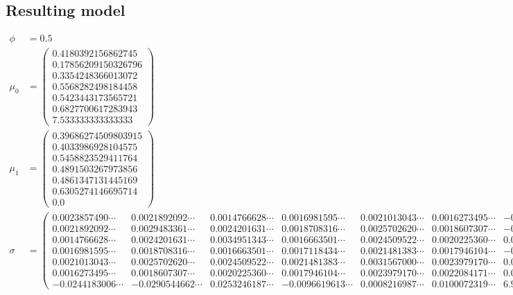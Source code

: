 \documentclass[parskip=half,a4paper,portrait]{scrartcl}
\begin{document}
\begin{landscape}
\section*{Resulting model}

\label{model}

\begin{align*}
    \phi &= 0.5\\
    \mu_0 &=
    \begin{pmatrix}
    0.4180392156862745\\
    0.17856209150326796\\
    0.3354248366013072\\
    0.5568282498184458\\
    0.5423443173565721\\
    0.6827700617283943\\
    7.533333333333333
    \end{pmatrix}\\
    \mu_1 &= \begin{pmatrix}
    0.39686274509803915\\
    0.4033986928104575\\
    0.5458823529411764\\
    0.4891503267973856\\
    0.4861347131445169\\
    0.6305274146695714\\
    0.0
    \end{pmatrix}\\
    \sigma &=
\begin{pmatrix}
 0.0023857490\cdots &  0.0021892092\cdots & 0.0014766628\cdots &  0.0016981595\cdots & 0.0021013043\cdots  & 0.0016273495\cdots & -0.0244183006\cdots \\
 0.0021892092\cdots &  0.0029483361\cdots  & 0.0024201631\cdots &  0.0018708316\cdots  & 0.0025702620\cdots & 0.0018607307\cdots & -0.0290544662\cdots \\
 0.0014766628\cdots &  0.0024201631\cdots & 0.0034951343\cdots &  0.0016663501\cdots & 0.0024509522\cdots & 0.0020225360\cdots &  0.0253246187\cdots \\
 0.0016981595\cdots &  0.0018708316\cdots  & 0.0016663501\cdots &  0.0017118434\cdots  & 0.0021481383\cdots  & 0.0017946104\cdots & -0.0096619613\cdots \\
 0.0021013043\cdots  &  0.0025702620\cdots & 0.0024509522\cdots &  0.0021481383\cdots  & 0.0031567000\cdots & 0.0023979170\cdots   &  0.0008216987\cdots \\
 0.0016273495\cdots &  0.0018607307\cdots & 0.0020225360\cdots &  0.0017946104\cdots & 0.0023979170\cdots   & 0.0022084171\cdots &  0.0100072319\cdots \\
-0.0244183006\cdots  & -0.0290544662\cdots  & 0.0253246187\cdots   & -0.0096619613\cdots   & 0.0008216987\cdots & 0.0100072319\cdots  &  6.9244444444\cdots
    \end{pmatrix}
\end{align*}

\end{landscape}
\end{document}
